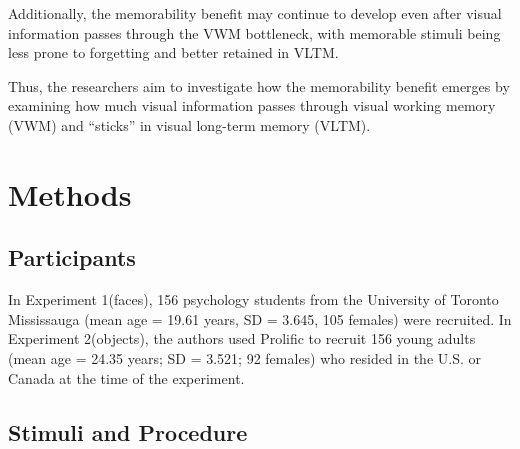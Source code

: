 \documentclass[
  man]{apa6}
\begin{document}
Additionally, the memorability benefit may continue to develop even after visual information passes through the VWM bottleneck, with memorable stimuli being less prone to forgetting and better retained in VLTM.

Thus, the researchers aim to investigate how the memorability benefit emerges by examining how much visual information passes through visual working memory (VWM) and ``sticks'' in visual long-term memory (VLTM).

\hypertarget{methods}{%
\section{Methods}\label{methods}}

\hypertarget{participants}{%
\subsection{Participants}\label{participants}}

In Experiment 1(faces), 156 psychology students from the University of Toronto Mississauga (mean age = 19.61 years, SD = 3.645, 105 females) were recruited.
In Experiment 2(objects), the authors used Prolific to recruit 156 young adults (mean age = 24.35 years; SD = 3.521; 92 females) who resided in the U.S. or Canada at the time of the experiment.

\hypertarget{stimuli-and-procedure}{%
\subsection{Stimuli and Procedure}\label{stimuli-and-procedure}}
\end{document}
